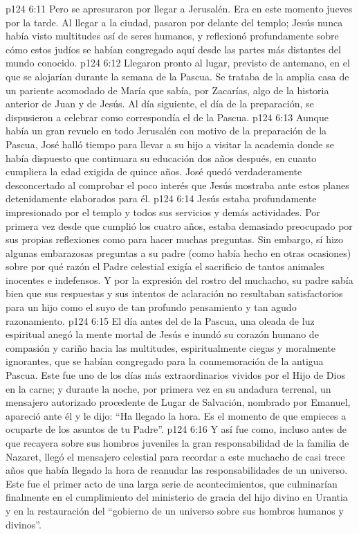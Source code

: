 \vs p124 6:11 Pero se apresuraron por llegar a Jerusalén. Era en este momento jueves por la tarde. Al llegar a la ciudad, pasaron por delante del templo; Jesús nunca había visto multitudes así de seres humanos, y reflexionó profundamente sobre cómo estos judíos se habían congregado aquí desde las partes más distantes del mundo conocido.
\vs p124 6:12 Llegaron pronto al lugar, previsto de antemano, en el que se alojarían durante la semana de la Pascua. Se trataba de la amplia casa de un pariente acomodado de María que sabía, por Zacarías, algo de la historia anterior de Juan y de Jesús. Al día siguiente, el día de la preparación, se dispusieron a celebrar como correspondía el  de la Pascua.
\vs p124 6:13 Aunque había un gran revuelo en todo Jerusalén con motivo de la preparación de la Pascua, José halló tiempo para llevar a su hijo a visitar la academia donde se había dispuesto que continuara su educación dos años después, en cuanto cumpliera la edad exigida de quince años. José quedó verdaderamente desconcertado al comprobar el poco interés que Jesús mostraba ante estos planes detenidamente elaborados para él.
\vs p124 6:14 Jesús estaba profundamente impresionado por el templo y todos sus servicios y demás actividades. Por primera vez desde que cumplió los cuatro años, estaba demasiado preocupado por sus propias reflexiones como para hacer muchas preguntas. Sin embargo, sí hizo algunas embarazosas preguntas a su padre (como había hecho en otras ocasiones) sobre por qué razón el Padre celestial exigía el sacrificio de tantos animales inocentes e indefensos. Y por la expresión del rostro del muchacho, su padre sabía bien que sus respuestas y sus intentos de aclaración no resultaban satisfactorios para un hijo como el suyo de tan profundo pensamiento y tan agudo razonamiento.
\vs p124 6:15 \pc El día antes del  de la Pascua, una oleada de luz espiritual anegó la mente mortal de Jesús e inundó su corazón humano de compasión y cariño hacia las multitudes, espiritualmente ciegas y moralmente ignorantes, que se habían congregado para la conmemoración de la antigua Pascua. Este fue uno de los días más extraordinarios vividos por el Hijo de Dios en la carne; y durante la noche, por primera vez en su andadura terrenal, un mensajero autorizado procedente de Lugar de Salvación, nombrado por Emanuel, apareció ante él y le dijo: “Ha llegado la hora. Es el momento de que empieces a ocuparte de los asuntos de tu Padre”.
\vs p124 6:16 Y así fue como, incluso antes de que recayera sobre sus hombros juveniles la gran responsabilidad de la familia de Nazaret, llegó el mensajero celestial para recordar a este muchacho de casi trece años que había llegado la hora de reanudar las responsabilidades de un universo. Este fue el primer acto de una larga serie de acontecimientos, que culminarían finalmente en el cumplimiento del ministerio de gracia del hijo divino en Urantia y en la restauración del “gobierno de un universo sobre sus hombros humanos y divinos”.
